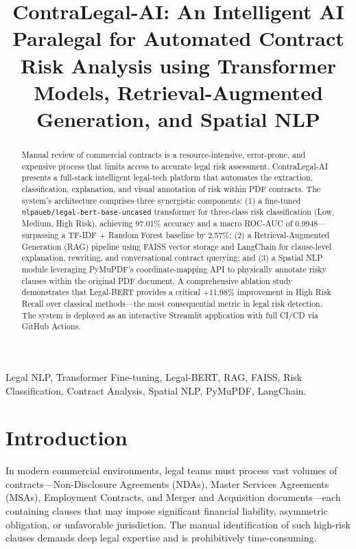 \documentclass[conference]{IEEEtran}
\begin{document}
\title{ContraLegal-AI: An Intelligent AI Paralegal for Automated Contract Risk Analysis using Transformer Models, Retrieval-Augmented Generation, and Spatial NLP}

\author{
}

\maketitle

\begin{abstract}
Manual review of commercial contracts is a resource-intensive, error-prone, and expensive process that limits access to accurate legal risk assessment. ContraLegal-AI presents a full-stack intelligent legal-tech platform that automates the extraction, classification, explanation, and visual annotation of risk within PDF contracts. The system's architecture comprises three synergistic components: (1) a fine-tuned \texttt{nlpaueb/legal-bert-base-uncased} transformer for three-class risk classification (Low, Medium, High Risk), achieving 97.01\% accuracy and a macro ROC-AUC of 0.9948---surpassing a TF-IDF + Random Forest baseline by 2.57\%; (2) a Retrieval-Augmented Generation (RAG) pipeline using FAISS vector storage and LangChain for clause-level explanation, rewriting, and conversational contract querying; and (3) a Spatial NLP module leveraging PyMuPDF's coordinate-mapping API to physically annotate risky clauses within the original PDF document. A comprehensive ablation study demonstrates that Legal-BERT provides a critical +11.98\% improvement in High Risk Recall over classical methods---the most consequential metric in legal risk detection. The system is deployed as an interactive Streamlit application with full CI/CD via GitHub Actions.
\end{abstract}

\begin{IEEEkeywords}
Legal NLP, Transformer Fine-tuning, Legal-BERT, RAG, FAISS, Risk Classification, Contract Analysis, Spatial NLP, PyMuPDF, LangChain.
\end{IEEEkeywords}

\section{Introduction}
In modern commercial environments, legal teams must process vast volumes of contracts---Non-Disclosure Agreements (NDAs), Master Services Agreements (MSAs), Employment Contracts, and Merger and Acquisition documents---each containing clauses that may impose significant financial liability, asymmetric obligation, or unfavorable jurisdiction. The manual identification of such high-risk clauses demands deep legal expertise and is prohibitively time-consuming.
\end{document}
